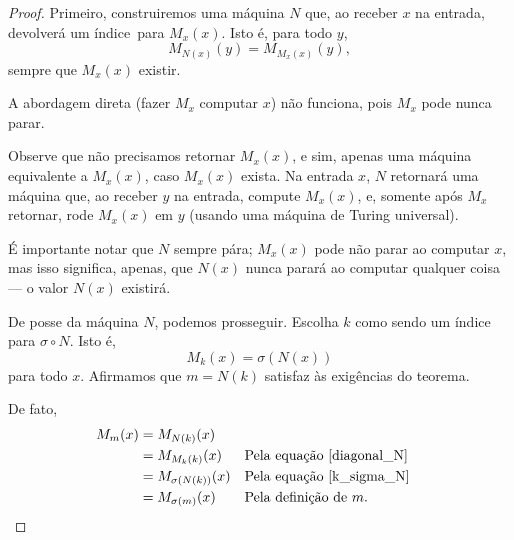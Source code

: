 \begin{proof}
    Primeiro, construiremos uma máquina $N$ que,
    ao receber $x$ na entrada,
    devolverá um índice\footnotemark\ para $M_x(x)$.
    Isto é,
    para todo $y$,
    \begin{equation}
        M_{N(x)}(y) = M_{M_x(x)}(y),
        \label{diagonal_N}
    \end{equation}
    sempre que $M_x(x)$ existir.

    A abordagem direta
    (fazer $M_x$ computar $x$)
    não funciona,
    pois $M_x$ pode nunca parar.

    Observe que não precisamos retornar $M_x(x)$,
    e sim, apenas uma máquina equivalente a $M_x(x)$,
    caso $M_x(x)$ exista.
    Na entrada $x$, $N$ retornará uma máquina que,
    ao receber $y$ na entrada,
    compute $M_x(x)$,
    e, somente após $M_x$ retornar,
    rode $M_x(x)$ em $y$
    (usando uma máquina de Turing universal).

    É importante notar que $N$ sempre pára;
    $M_x(x)$ pode não parar ao computar $x$,
    mas isso significa, apenas,
    que $N(x)$ nunca parará ao computar qualquer coisa
    --- o valor $N(x)$ existirá.

    De posse da máquina $N$, podemos prosseguir.
    Escolha $k$ como sendo um índice para $\sigma \circ N$.
    Isto é,
    \begin{equation}
        M_k(x) = \sigma(N(x))
        \label{k_sigma_N}
    \end{equation}
    para todo $x$.
    Afirmamos que $m = N(k)$
    satisfaz às exigências do teorema.

    De fato,
    \begin{align*}
        M_m(x) &= M_{N(k)}(x) \\
               &= M_{M_k(k)}(x) && \text{Pela equação~\ref{diagonal_N}}\\
               &= M_{\sigma(N(k))}(x) && \text{Pela equação~\ref{k_sigma_N}}\\
               &= M_{\sigma(m)}(x) && \text{Pela definição de $m$.}
    \end{align*}
\end{proof}

